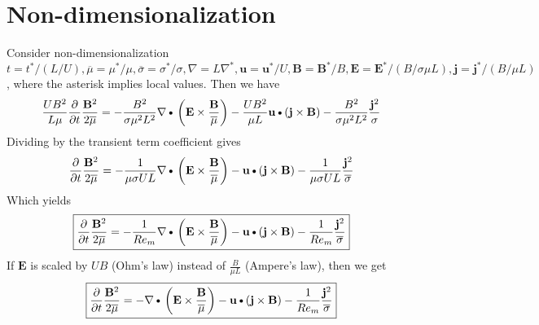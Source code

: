 \documentclass[11pt]{article}
\newcommand{\B}{\mathbf{B}}
\newcommand{\PD}{\partial}
\newcommand{\J}{\mathbf{j}}
\newcommand{\E}{\mathbf{E}}
\newcommand{\JSS}{\frac{\mathbf{j}^2}{\sigma}}
\renewcommand{\U}{\mathbf{u}}
\newcommand{\MO}{\overline{\mu}}
\newcommand{\SO}{\overline{\sigma}}
\newcommand{\DOT}{\text{\textbullet}}
\begin{document}
\section{Non-dimensionalization}
Consider non-dimensionalization $t=t^*/(L/U), \MO = \mu^*/\mu, \SO = \sigma^*/\sigma, \nabla = L \nabla^*, \U = \U^*/U, \B = \B^*/B, \E = \E^* / (B/ \sigma \mu L), \J = \J^* / (B/\mu L)$, where the asterisk implies local values. Then we have
\begin{equation}
	\frac{UB^2}{L \mu}
	\frac{\PD }{\PD t} \frac{\B^2}{2 \MO}
	=
	- \frac{B^2}{\sigma \mu^2 L^2} \nabla \DOT \left(\E \times \frac{\B}{\MO} \right)
	- \frac{U B^2}{\mu L} \U \DOT (\J \times \B)
	- \frac{B^2}{\sigma \mu^2 L^2} \JSS
\end{equation}
Dividing by the transient term coefficient gives
\begin{equation}
	\frac{\PD }{\PD t} \frac{\B^2}{2 \MO}
	=
	- \frac{1}{\mu \sigma U L} \nabla \DOT \left(\E \times \frac{\B}{\MO} \right)
	- \U \DOT (\J \times \B)
	- \frac{1}{\mu \sigma U L} \frac{\J^2}{\SO}
\end{equation}
Which yields
\begin{equation} \label{eq:nrg}
	\boxed{
	\frac{\PD }{\PD t} \frac{\B^2}{2 \MO}
	=
	- \frac{1}{Re_m} \nabla \DOT \left(\E \times \frac{\B}{\MO} \right)
	- \U \DOT (\J \times \B)
	- \frac{1}{Re_m} \frac{\J^2}{\SO}
	}
\end{equation}
If $\E$ is scaled by $UB$ (Ohm's law) instead of $\frac{B}{\mu L}$ (Ampere's law), then we get
\begin{equation}
	\boxed{
	\frac{\PD }{\PD t} \frac{\B^2}{2 \MO}
	=
	- \nabla \DOT \left(\E \times \frac{\B}{\MO} \right)
	- \U \DOT (\J \times \B)
	- \frac{1}{Re_m} \frac{\J^2}{\SO}
	}
\end{equation}
\end{document}
